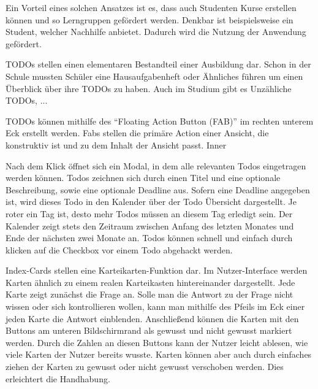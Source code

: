 Ein Vorteil eines solchen Ansatzes ist es, dass auch Studenten Kurse erstellen können und so Lerngruppen gefördert werden.
Denkbar ist beispielsweise ein Student, welcher Nachhilfe anbietet.
Dadurch wird die Nutzung der Anwendung gefördert.




TODOs stellen einen elementaren Bestandteil einer Ausbildung dar.
Schon in der Schule mussten Schüler eine Hausaufgabenheft oder Ähnliches führen um einen Überblick über ihre TODOs zu haben.
Auch im Studium gibt es Unzähliche TODOs, ...

TODOs können mithilfe des \enquote{Floating Action Button (FAB)} im rechten unterem Eck erstellt werden. %
Fabs stellen die primäre Action einer Ansicht, die konstruktiv ist und zu dem Inhalt der Ansicht passt.
Inner


Nach dem Klick öffnet sich ein Modal, in dem alle relevanten Todos eingetragen werden können.
Todos zeichnen sich durch einen Titel und eine optionale Beschreibung, sowie eine optionale Deadline aus.
Sofern eine Deadline angegeben ist, wird dieses Todo in den Kalender über der Todo Übersicht dargestellt.
Je roter ein Tag ist, desto mehr Todos müssen an diesem Tag erledigt sein.
Der Kalender zeigt stets den Zeitraum zwischen Anfang des letzten Monates und Ende der nächsten zwei Monate  an.
Todos können schnell und einfach durch klicken auf die Checkbox vor einem Todo abgehackt werden.


Index-Cards stellen eine Karteikarten-Funktion dar.
Im Nutzer-Interface werden Karten ähnlich zu einem realen Karteikasten hintereinander dargestellt.
Jede Karte zeigt zunächst die Frage an.
Solle man die Antwort zu der Frage nicht wissen oder sich kontrollieren wollen, kann man mithilfe des Pfeils im Eck einer jeden Karte die Antwort einblenden.
Anschließend können die Karten mit den Buttons am unteren Bildschirmrand als gewusst und nicht gewusst markiert werden.
Durch die Zahlen an diesen Buttons kann der Nutzer leicht ablesen, wie viele Karten der Nutzer bereits wusste.
Karten können aber auch durch einfaches ziehen der Karten zu gewusst oder nicht gewusst verschoben werden.
Dies erleichtert die Handhabung.


